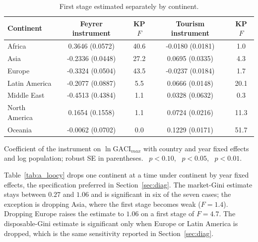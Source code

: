 \begin{table}[H]\centering\caption{First stage estimated separately by continent.}\label{tab:a_fscont}
\begin{threeparttable}\small\begin{tabular}{lcccc}
\toprule
Continent & Feyrer instrument & KP $F$ & Tourism instrument & KP $F$ \\
\midrule
Africa & 0.3646\sym{***} (0.0572) & 40.6 & -0.0180 (0.0181) & 1.0 \\
Asia & -0.2336\sym{***} (0.0448) & 27.2 & 0.0695\sym{**} (0.0335) & 4.3 \\
Europe & -0.3324\sym{***} (0.0504) & 43.5 & -0.0237 (0.0184) & 1.7 \\
Latin America & -0.2077\sym{**} (0.0887) & 5.5 & 0.0666\sym{***} (0.0148) & 20.1 \\
Middle East & -0.4513 (0.4384) & 1.1 & 0.0328 (0.0632) & 0.3 \\
North America & 0.1654 (0.1558) & 1.1 & 0.0724\sym{***} (0.0216) & 11.3 \\
Oceania & -0.0062 (0.0702) & 0.0 & 0.1229\sym{***} (0.0171) & 51.7 \\
\bottomrule
\end{tabular}
\begin{tablenotes}\footnotesize\item Coefficient of the instrument on $\ln\mathrm{GACI}_{max}$ with country and year fixed effects and log population; robust SE in parentheses. \sym{*}~$p<0.10$, \sym{**}~$p<0.05$, \sym{***}~$p<0.01$.\end{tablenotes}\end{threeparttable}\end{table}

Table~\ref{tab:a_loocy} drops one continent at a time under continent by year fixed effects, the specification preferred in Section~\ref{sec:diag}. The market-Gini estimate stays between $0.27$ and $1.06$ and is significant in six of the seven cases; the exception is dropping Asia, where the first stage becomes weak ($F=1.4$). Dropping Europe raises the estimate to $1.06$ on a first stage of $F=4.7$. The disposable-Gini estimate is significant only when Europe or Latin America is dropped, which is the same sensitivity reported in Section~\ref{sec:diag}.

